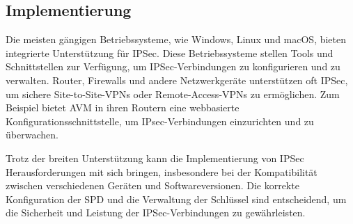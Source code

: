 \subsection{Implementierung}
Die meisten gängigen Betriebssysteme, wie Windows, Linux und macOS, bieten integrierte Unterstützung für \gls{IPSec}. Diese Betriebssysteme stellen Tools und Schnittstellen zur Verfügung, um \gls{IPSec}-Verbindungen zu konfigurieren und zu verwalten. Router, Firewalls und andere Netzwerkgeräte unterstützen oft \gls{IPSec}, um sichere Site-to-Site-\gls{VPN}s oder Remote-Access-\gls{VPN}s zu ermöglichen. Zum Beispiel bietet AVM in ihren Routern eine webbasierte Konfigurationsschnittstelle, um IPsec-Verbindungen einzurichten und zu überwachen. \cite{Ipsec_VPN_Design, VPN_with_FRITZ!Box} 

Trotz der breiten Unterstützung kann die Implementierung von \gls{IPSec} Herausforderungen mit sich bringen, insbesondere bei der Kompatibilität zwischen verschiedenen Geräten und Softwareversionen. Die korrekte Konfiguration der \gls{SPD} und die Verwaltung der Schlüssel sind entscheidend, um die Sicherheit und Leistung der \gls{IPSec}-Verbindungen zu gewährleisten. \cite{BSI_VPN_10}

